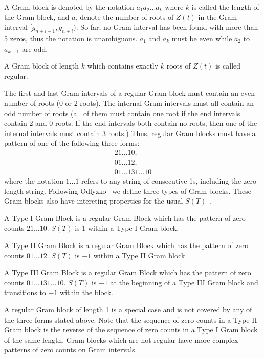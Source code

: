 \documentclass[twoside]{article}
\begin{document}
A Gram block is denoted by the notation $a_1a_2 . . . a_k$ where $k$ is called the length of the Gram block, and $a_i$ denote the number of roots of $Z(t)$ in the Gram interval $[g_{n+i-1}, g_{n+i})$. So far, no Gram interval has been found with more than 5 zeros, thus the notation is unambiguous. $a_1$ and $a_k$ must be even while  $a_2$ to $a_{k-1}$ are odd.
{
\begin{definition}\label{regulargramblock}
A Gram block of length $k$ which contains exactly $k$ roots of {$Z(t)$} is called regular. 
\end{definition}
}
The first and last Gram intervals of a regular Gram block must contain an even number of roots (0 or 2 roots). 
The internal Gram intervals must all contain an odd number of roots (all of them must contain one root if the end intervals contain 2 and 0 roots. If the end intervals both contain no roots, then one of the internal intervals must contain 3 roots.) 
Thus, regular Gram blocks must have a pattern of one of the following three forms:
\begin{eqnarray}
21 . . . 10,\nonumber\\
 01 . . . 12,\nonumber \\
 01 . . . 131 . . . 10
\label{types}
\end{eqnarray}
where the notation $1 . . . 1$ refers to any string of consecutive 1s, including the zero length string. 
Following Odlyzko~\cite{Odlyzko 1992} we define three types of Gram blocks.  These Gram blocks also 
have intereting properties for the usual $S(T)$~\cite{Edwards(1974)}.
\begin{definition}\label{gramblockI}
A Type I Gram Block is a regular Gram Block which has the pattern of zero counts $21...10$.
$S(T)$ is $1$ within a Type I Gram block.
\end{definition}
\begin{definition}\label{gramblockII}
A Type II Gram Block is a regular Gram Block which has the pattern of zero counts $01 . . . 12$.
$S(T)$ is $-1$ within a Type II Gram block.
\end{definition}
\begin{definition}\label{gramblockIII}
A Type III Gram Block is a regular Gram Block which has the pattern of zero counts $01 . . . 131 . . . 10$.
$S(T)$ is $-1$ at the beginning of a Type III Gram block and transitions to $-1$ within the block.
\end{definition}
A regular Gram block of length 1 is a special case and is not covered by any of the three forms stated above. Note that the sequence of zero counts in a Type II Gram block is the reverse of the sequence of zero counts in a Type I Gram block of the same length.   Gram blocks which are not regular have more complex patterns of zero counts on Gram intervals.
\end{document}

